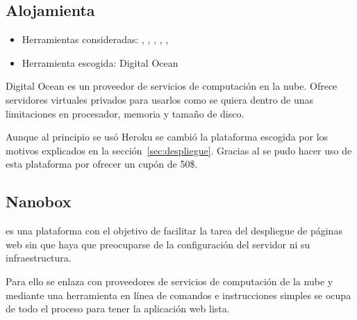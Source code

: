 \subsection{Alojamienta}

\begin{itemize}
	\tightlist
	\item Herramientas consideradas:
	,
	,
	,
	,
	,
	\item Herramienta escogida: Digital Ocean
\end{itemize}

Digital Ocean es un proveedor de servicios de computación en la nube. Ofrece
servidores virtuales privados para usarlos como se quiera dentro de unas
limitaciones en procesador, memoria y tamaño de disco.

Aunque al principio se usó Heroku se cambió la plataforma escogida por los
motivos explicados en la sección~\ref{sec:despliegue}. Gracias al
 se pudo
hacer uso de esta plataforma por ofrecer un cupón de 50\$.

\subsection{Nanobox}

 es una plataforma con el objetivo de
facilitar la tarea del despliegue de páginas web sin que haya que preocuparse de
la configuración del servidor ni su infraestructura.

Para ello se enlaza con proveedores de servicios de computación de la nube y
mediante una herramienta en línea de comandos e instrucciones simples se ocupa
de todo el proceso para tener la aplicación web lista.
